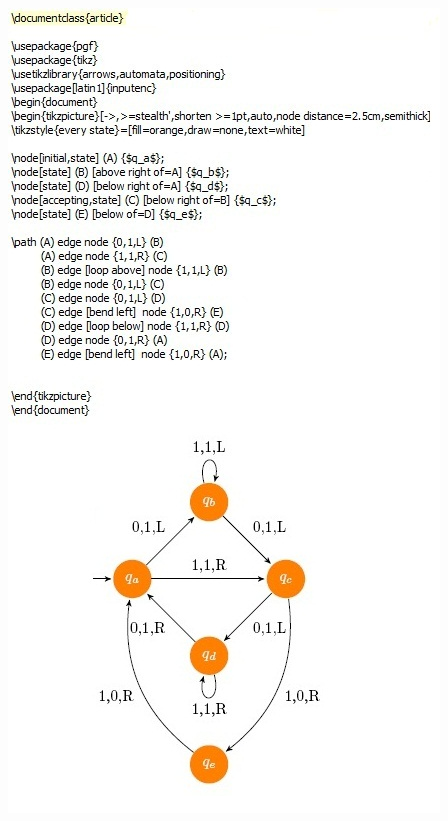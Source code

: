 \documentclass[12pt,a4paper,spanish]{book}
\begin{document}
\begin{itemize}
\begin{enumerate}
\begin{center}
\includegraphics{late2.jpg}
\end{center}



\end{enumerate}
\end{itemize}
\end{document}
